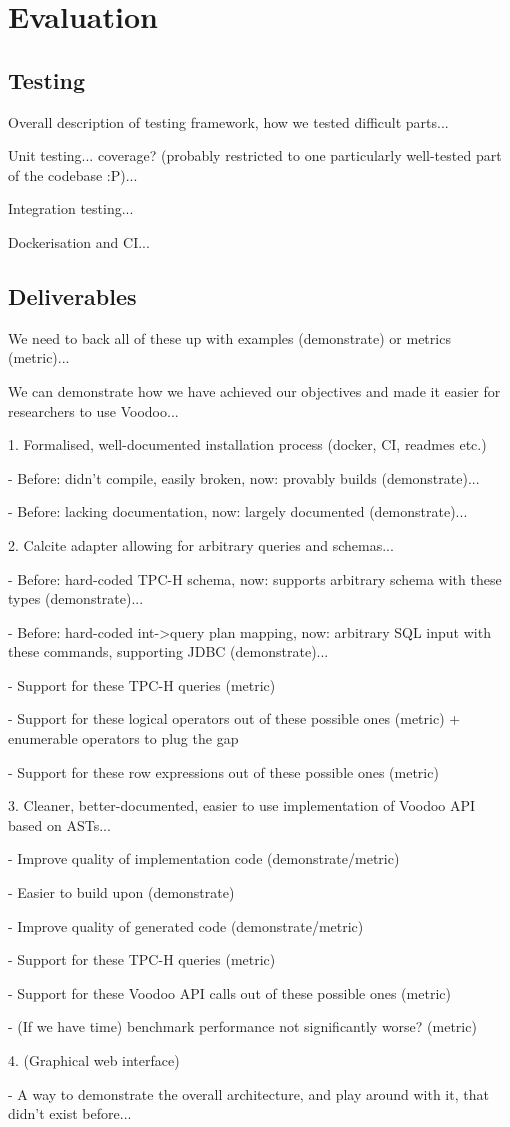 \chapter{Evaluation}

\section{Testing}

Overall description of testing framework, how we tested difficult parts...

Unit testing... coverage? (probably restricted to one particularly well-tested part of the codebase :P)...

Integration testing...

Dockerisation and CI...

\section{Deliverables}

We need to back all of these up with examples (demonstrate) or metrics (metric)...

We can demonstrate how we have achieved our objectives and made it easier for researchers to use Voodoo...

1. Formalised, well-documented installation process (docker, CI, readmes etc.)

- Before: didn't compile, easily broken, now: provably builds (demonstrate)...

- Before: lacking documentation, now: largely documented (demonstrate)...

2. Calcite adapter allowing for arbitrary queries and schemas...

- Before: hard-coded TPC-H schema, now: supports arbitrary schema with these types (demonstrate)...

- Before: hard-coded int->query plan mapping, now: arbitrary SQL input with these commands, supporting JDBC (demonstrate)...

- Support for these TPC-H queries (metric)

- Support for these logical operators out of these possible ones (metric) + enumerable operators to plug the gap

- Support for these row expressions out of these possible ones (metric)

3. Cleaner, better-documented, easier to use implementation of Voodoo API based on ASTs...

- Improve quality of implementation code (demonstrate/metric)

- Easier to build upon (demonstrate)

- Improve quality of generated code (demonstrate/metric)

- Support for these TPC-H queries (metric)

- Support for these Voodoo API calls out of these possible ones (metric)

- (If we have time) benchmark performance not significantly worse? (metric)

4. (Graphical web interface)

- A way to demonstrate the overall architecture, and play around with it, that didn't exist before...

